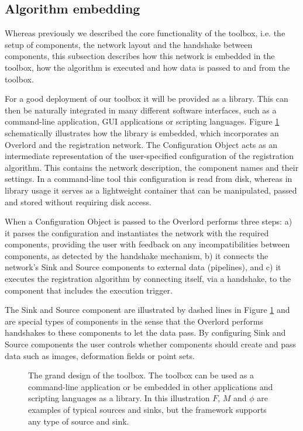 \subsection{Algorithm embedding}

Whereas previously we described the core functionality of the
toolbox, i.e. the setup of components, the network layout and the
handshake between components, this subsection describes how this
network is embedded in the toolbox, how the algorithm is executed
and how data is passed to and from the toolbox.

For a good deployment of our toolbox it will be provided as a
library. This can then be naturally integrated in many different
software interfaces, such as a command-line application, GUI
applications or scripting languages. Figure \ref{fig:toolbox_layout}
schematically illustrates how the \SuperElastix{} library is
embedded, which incorporates an Overlord and the registration
network. The Configuration Object acts as an intermediate
representation of the user-specified configuration of the
registration algorithm. This contains the network description, the
component names and their settings. In a command-line tool this
configuration is read from disk, whereas in library usage it serves
as a lightweight container that can be manipulated, passed and
stored without requiring disk access.

When a Configuration Object is passed to \SuperElastix{} the
Overlord performs three steps: a) it parses the configuration and
instantiates the network with the required components, providing the
user with feedback on any incompatibilities between components, as detected by the handshake mechanism, b)
it connects the network's Sink and Source components to external
data (pipelines), and c) it executes the registration algorithm by connecting itself, via a handshake, to the component that includes the execution trigger.

The Sink and Source component are illustrated by dashed lines in
Figure \ref{fig:toolbox_layout} and are special types of components
in the sense that the Overlord performs handshakes to these
components to let the data pass. By configuring Sink and Source
components the user controls whether components should create and
pass data such as images, deformation fields or point sets.

\begin{figure}
\centering
 \scalebox{1.0}{
  
 }
\caption{The grand design of the \SuperElastix{} toolbox. The
toolbox can be used as a command-line application or be embedded in
other applications and scripting languages as a library. In this illustration $F$, $M$ and $\phi$ are examples of typical sources and sinks, but the framework supports any type of source and sink.}
\label{fig:toolbox_layout}
\end{figure}
